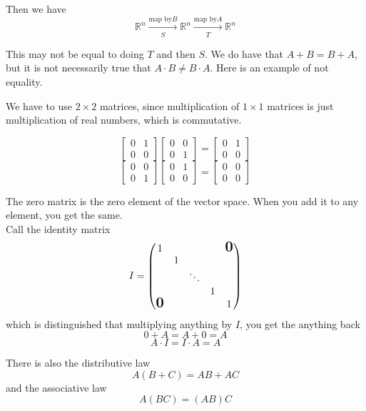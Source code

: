 \documentclass[12pt]{article}
\newcommand{\RR}{\mathbb{R}}
\theoremstyle{definition}
\begin{document}
Then we have
\[\RR^n\xrightarrow[S]{\text{map by} B}\RR^n\xrightarrow[T]{\text{map by} A}\RR^n\]

This may not be equal to doing \(T\) and then \(S\). We do have 
that \(A + B = B + A\), but it is not necessarily true that
\(A \cdot B \neq B \cdot A\). Here is an example of not equality.

We have to use \(2 \times 2\) matrices, since multiplication of
\(1 \times 1\) matrices is just multiplication of real numbers, which is
commutative.

\[
\begin{bmatrix}
    0 & 1\\
    0 & 0
\end{bmatrix}
\begin{bmatrix}
    0 & 0\\
    0 & 1
\end{bmatrix} =
\begin{bmatrix}
    0 & 1\\
    0 & 0
\end{bmatrix}\]
\[
\begin{bmatrix}
    0 & 0\\
    0 & 1
\end{bmatrix}
\begin{bmatrix}
    0 & 1\\
    0 & 0
\end{bmatrix} =
\begin{bmatrix}
    0 & 0\\
    0 & 0
\end{bmatrix}
\] 

The zero matrix is the zero element of the vector space.
When you add it to any element, you get the same.
\\

Call the identity matrix 
\[I = \begin{pmatrix}
1 & & & & \mbox{\normalfont\Large\bfseries 0}\\
& 1 & & & \\
& & \ddots & & \\
& & & 1 & \\
\mbox{\normalfont\Large\bfseries 0} & & & & 1
\end{pmatrix}\]
which is distinguished that multiplying anything by \( I \),
you get the anything back
\[0 + A = A + 0 = A\]
\[A\cdot I = I \cdot A = A\]

There is also the distributive law
\[A(B+C) = AB + AC\]
and the associative law 
\[A(BC) = (AB)C\]
\end{document}
